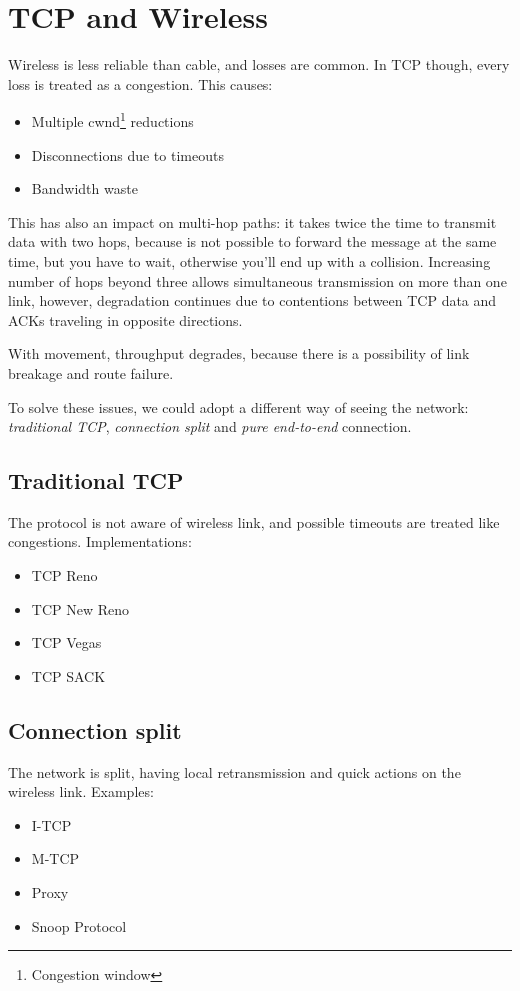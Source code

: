 \section{TCP and Wireless}

Wireless is less reliable than cable, and losses are common. In TCP though,
every loss is treated as a congestion. This causes:
\begin{itemize}
\item Multiple cwnd\footnote{Congestion window} reductions
\item Disconnections due to timeouts
\item Bandwidth waste
\end{itemize}

This has also an impact on multi-hop paths: it takes twice the time to
transmit data with two hops, because is not possible to forward the message at
the same time, but you have to wait, otherwise you'll end up with a collision.
Increasing number of hops beyond three allows simultaneous transmission on more
than one link, however, degradation continues due to contentions between TCP
data and ACKs traveling in opposite directions.

With movement, throughput degrades, because there is a possibility of link
breakage and route failure.

To solve these issues, we could adopt a different way of seeing the network:
\textit{traditional TCP}, \textit{connection split} and
\textit{pure end-to-end} connection.

\subsection{Traditional TCP} The protocol is not aware of wireless link, and
possible timeouts are treated like congestions. Implementations:
\begin{itemize}
\item TCP Reno
\item TCP New Reno
\item TCP Vegas
\item TCP SACK
\end{itemize}

\subsection{Connection split} The network is split, having local
retransmission and quick actions on the wireless link.
Examples:
\begin{itemize}
\item I-TCP
\item M-TCP
\item Proxy
\item Snoop Protocol
\end{itemize}


